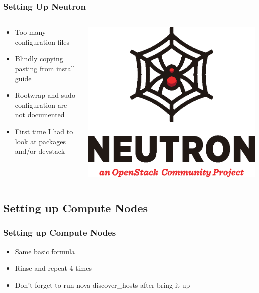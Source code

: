 \documentclass[aspectratio=169,11pt,hyperref={colorlinks=true}]{beamer}
\begin{document}
\begin{frame}
    \frametitle{Setting Up Neutron}
    \begin{columns}[T]
        \begin{column}{.48\textwidth}
            \begin{itemize}
                \item Too many configuration files
                \item Blindly copying pasting from install guide
                \item Rootwrap and sudo configuration are not documented
                \item First time I had to look at packages and/or devstack
            \end{itemize}
        \end{column}
        \begin{column}{.48\textwidth}
            \includegraphics[width=\textwidth]{mascots/neutron.eps}
        \end{column}
    \end{columns}
\end{frame}

\subsection{Setting up Compute Nodes}
\begin{frame}
    \frametitle{Setting up Compute Nodes}

    \begin{itemize}
        \item Same basic formula
        \item Rinse and repeat 4 times
        \item Don't forget to run nova discover\_hosts after bring it up
    \end{itemize}
\end{frame}
\end{document}
